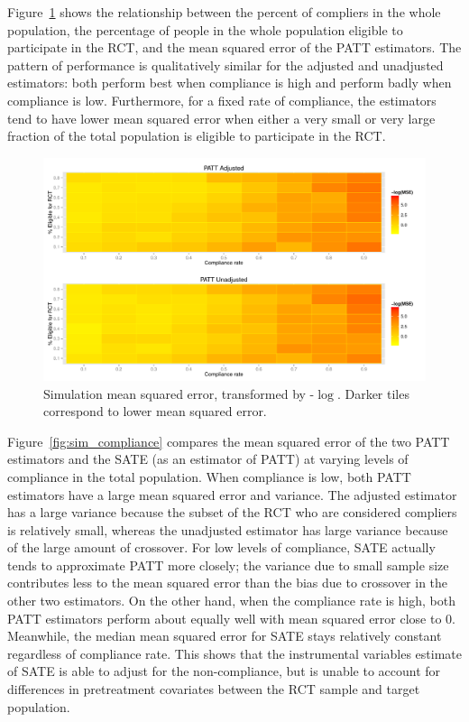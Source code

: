 \documentclass[12pt]{article}
\begin{document}
Figure~\ref{fig:sim_tiles} shows the relationship between the percent of compliers in the whole population, the percentage of people in the whole population eligible to participate in the RCT, and the mean squared error of the PATT estimators.  The pattern of performance is qualitatively similar for the adjusted and unadjusted estimators: both perform best when compliance is high and perform badly when compliance is low.  Furthermore, for a fixed rate of compliance, the estimators tend to have lower mean squared error when either a very small or very large fraction of the total population is eligible to participate in the RCT. \\



\begin{figure}[h]
\begin{center}
\includegraphics[width = 1\textwidth]{mse_ratec_rates_B5}
\caption{Simulation mean squared error, transformed by -$\log$. Darker tiles correspond to lower mean squared error.}
\label{fig:sim_tiles}
\end{center}
\end{figure}

Figure~\ref{fig:sim_compliance} compares the mean squared error of the two PATT estimators and the SATE (as an estimator of PATT) at varying levels of compliance in the total population.  When compliance is low, both PATT estimators have a large mean squared error and variance.  The adjusted estimator has a large variance because the subset of the RCT who are considered compliers is relatively small, whereas the unadjusted estimator has large variance because of the large amount of crossover.  For low levels of compliance, SATE actually tends to approximate PATT more closely; the variance due to small sample size contributes less to the mean squared error than the bias due to crossover in the other two estimators.  On the other hand, when the compliance rate is high, both PATT estimators perform about equally well with mean squared error close to $0$.  Meanwhile, the median mean squared error for SATE stays relatively constant regardless of compliance rate.  This shows that the instrumental variables estimate of SATE is able to adjust for the non-compliance, but is unable to account for differences in pretreatment covariates between the RCT sample and target population.
\end{document}
